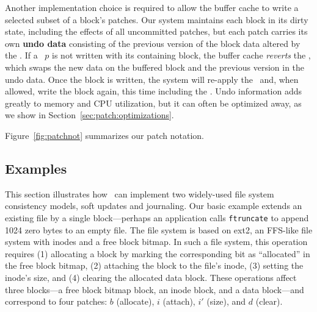 Another implementation choice is required to allow the buffer cache to
 write a selected subset of a block's patches.
%
Our system maintains each block in its dirty state, including the
 effects of all uncommitted patches, but
%
each patch carries its own \textbf{undo data} consisting of the 
 previous version of the block data altered by the \patch.
%
If a \patch\ $p$ is not written with its containing block, the buffer cache
 \emph{reverts} the \patch, which swaps the new data on the buffered block
 and the previous version in the undo data.
%
Once the block is written, the system will re-apply the \patch\ and, when
 allowed, write the block again, this time including the \patch.
%
Undo information adds greatly to memory and CPU utilization, but it can
 often be optimized away, as we show in Section~\ref{sec:patch:optimizations}.

Figure~\ref{fig:patchnot} summarizes our patch notation.

\label{sec:patch:dependencies}

\begin{comment}
\paragraph{Example}
%
Suppose a \Kudos\ system contains the \patches\ in Figure~\ref{f:ex}c,
where the journal entry patches $d_\textrm{J}$, $i_\textrm{J}$, and
 $b_\textrm{J}$ have committed and all other patches have not.
%
The buffer cache cannot write blocks $\PBlock{b}$, $\PBlock{i}$, or $\PBlock{d}$,
since $\{b$, $i$, $i'$, $d\} \PDDepend \PXcmt$ and $\PXcmt \not\in \PDisk$.
%
Its only option is to write $\PBlock{\PXcmt}$ with $P = \{\PXcmt\}$, since
 $\PDepset{\PXcmt} = \{d_\textrm{J}$, $i_\textrm{J}$, $b_\textrm{J}\}
 \subseteq \PDisk$.
%
Since $\PXcmp$ has unmet dependencies on other blocks, it must be undone
 before the write and is excluded from $P$.
%
Later, when $\PXcmt$ commits, the buffer cache has the option to
write any of $\PBlock{b}$, $\PBlock{i}$, or $\PBlock{d}$.
\end{comment}


\subsection{Examples}
\label{sec:patch:examples}

This section illustrates how \patches\ can implement two widely-used
 file system consistency models, soft updates and journaling.
%
Our basic example extends an existing file by a single block---perhaps an
 application calls \texttt{ftruncate} to append 1024 zero bytes to an
 empty file.
%
The file system is based on ext2, an FFS-like file system with inodes and
 a free block bitmap.
%
In such a file system, this operation requires (1) allocating a block by
 marking the corresponding bit as ``allocated'' in the free block bitmap,
 (2) attaching the block to the file's inode, (3) setting the inode's size,
 and (4) clearing the allocated data block.
%
These operations affect three blocks---a free block bitmap block, an inode
 block, and a data block---and correspond to four patches: $b$ (allocate),
 $i$ (attach), $i'$ (size), and $d$ (clear).


